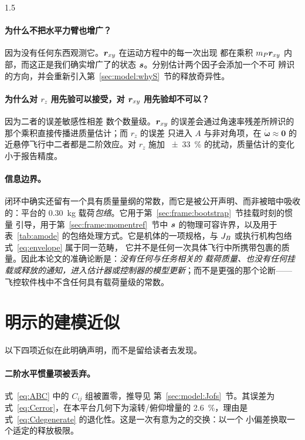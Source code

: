 \begin{spacing}{1.5}
\paragraph{为什么不把水平力臂也增广？}因为没有任何东西观测它。$\bm{r}_{xy}$ 在运动方程中的每一次出现
都在乘积 $m_P\bm{r}_{xy}$ 内部，而这正是我们确实增广了的状态 $\bm{s}$。分别估计两个因子会添加一个不可
辨识的方向，并会重新引入第~\ref{sec:model:whyS}~节的释放奇异性。

\paragraph{为什么对 $r_z$ 用先验可以接受，对 $\bm{r}_{xy}$ 用先验却不可以？}因为二者的误差敏感性相差
数个数量级。$\bm{r}_{xy}$ 的误差会通过角速率残差所辨识的那个乘积直接传播进质量估计；而 $r_z$ 的误差
只进入 $A$ 与非对角项，在 $\dot{\bm{\omega}}\approx\bm 0$ 的近悬停飞行中二者都是二阶效应。对
$r_z$ 施加 \SI{\pm33}{\percent} 的扰动，质量估计的变化小于报告精度。

\paragraph{信息边界。}闭环中确实还留有一个具有质量量纲的常数，而它是被公开声明、而非被暗中吸收
的：平台的 \SI{0.30}{\kg} 载荷\emph{包络}。它用于第~\ref{sec:frame:bootstrap}~节挂载时刻的惯量
引导，用于第~\ref{sec:frame:momentref}~节中 $\bm{s}$ 的物理可容许界，以及用于表~\ref{tab:amode}
的包络处理方式。它是机体的一项规格，与 $J_B$ 或执行机构包络式~\eqref{eq:envelope} 属于同一范畴，
它并不是任何一次具体飞行中所携带包裹的质量。因此本论文的准确论断是：\emph{没有任何与任务相关的
载荷质量、也没有任何挂载或释放的通知，进入估计器或控制器的模型更新}；而不是更强的那个论断——
飞控软件栈中不含任何具有载荷量级的常数。

\section{明示的建模近似}\label{sec:model:approx}

以下四项近似在此明确声明，而不是留给读者去发现。

\paragraph{二阶水平惯量项被丢弃。}式~\eqref{eq:ABC} 中的 $C_{ij}$ 组被置零，推导见
第~\ref{sec:model:Jofs}~节。其误差为式~\eqref{eq:Cerror}，在本平台几何下为滚转/俯仰增量的
\SI{2.6}{\percent}，理由是式~\eqref{eq:Cdegenerate} 的退化性。这是一次有意为之的交换：以一个
小偏差换取一个适定的释放极限。


\end{spacing}

